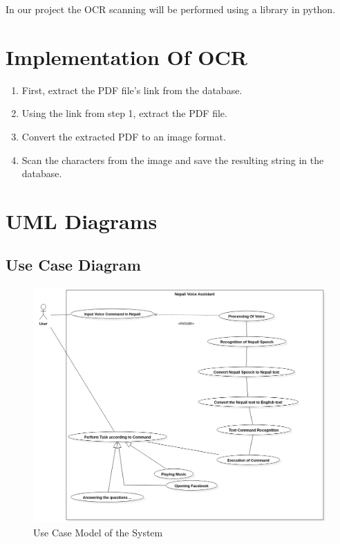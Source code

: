In our project the OCR scanning will be performed using a library in python.
\section*{Implementation Of OCR}
\begin{enumerate}
\item First, extract the PDF file's link from the database.
\item Using the link from step 1, extract the PDF file.
\item Convert the extracted PDF to an image format.
\item Scan the characters from the image and save the resulting string in the database.
\end{enumerate}



\newpage
\section{\ac{UML} Diagrams}
\subsection*{Use Case Diagram}
\begin{figure}[h!]
    \includegraphics[scale=0.45]{images/usecase.png}
    \caption{Use Case Model of the System}
    \label{fig:my_label}
\end{figure}
\newpage
